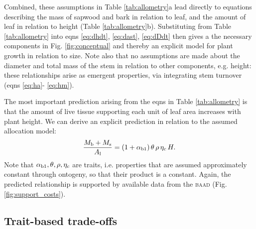 \documentclass[a4paper,11pt]{article}
\begin{document}
Combined, these assumptions in Table \ref{tab:allometry}a lead directly to equations describing the mass of sapwood and bark in relation to leaf, and the amount of leaf in relation to height (Table \ref{tab:allometry}b). Substituting from Table \ref{tab:allometry} into eqns \ref{eq:dhdt}, \ref{eq:dast}, \ref{eq:dDdt} then gives a the necessary components in Fig. \ref{fig:conceptual} and thereby an explicit model for plant growth in relation to size. Note also that no assumptions are made about the diameter and total mass of the stem in relation to other components, e.g. height: these relationships arise as emergent properties, via integrating stem turnover (eqns \ref{eq:ha}- \ref{eq:hm}).

The most important prediction arising from the eqns in Table \ref{tab:allometry} is that the amount of live tissue supporting each unit of leaf area increases with plant height. We can derive an explicit prediction in relation to the assumed allocation model:
\begin{equation}\label{eq:msml}
\frac{M_{\rm b} + M_{\rm s}}{A_{\rm l}} = (1+ \alpha_{\rm b1}) \,\theta \, \rho \, \eta_c \, H.
\end{equation}
Note that $\alpha_{\rm b1}, \theta, \rho, \eta_c$ are traits, i.e. properties that are assumed approximately constant through ontogeny, so that their product is a constant. Again, the predicted relationship is supported by available data from the \textsc{baad} (Fig. \ref{fig:support_costs}).

\subsection{Trait-based trade-offs}
\end{document}

